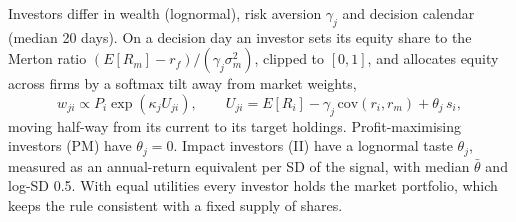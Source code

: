\documentclass[11pt]{article}
\begin{document}
Investors differ in wealth (lognormal), risk aversion $\gamma_j$ and decision calendar (median 20 days). On a decision day an investor sets its equity share to the Merton ratio $(E[R_m]-r_f)/(\gamma_j \sigma_m^2)$, clipped to $[0,1]$, and allocates equity across firms by a softmax tilt away from market weights,
\begin{equation}
w_{ji} \propto P_i \exp(\kappa_j U_{ji}), \qquad U_{ji} = E[R_i] - \gamma_j\,\mathrm{cov}(r_i, r_m) + \theta_j\, s_i ,
\label{eq:utility}
\end{equation}
moving half-way from its current to its target holdings. Profit-maximising investors (PM) have $\theta_j = 0$. Impact investors (II) have a lognormal taste $\theta_j$, measured as an annual-return equivalent per SD of the signal, with median $\bar\theta$ and log-SD 0.5. With equal utilities every investor holds the market portfolio, which keeps the rule consistent with a fixed supply of shares.
\end{document}
